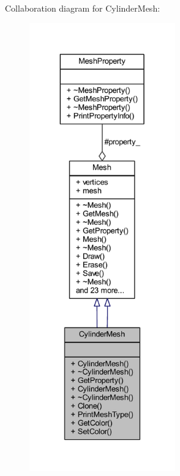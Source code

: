 Collaboration diagram for Cylinder\+Mesh\+:\nopagebreak
\begin{figure}[H]
\begin{center}
\leavevmode
\includegraphics[height=550pt]{class_cylinder_mesh__coll__graph}
\end{center}
\end{figure}
